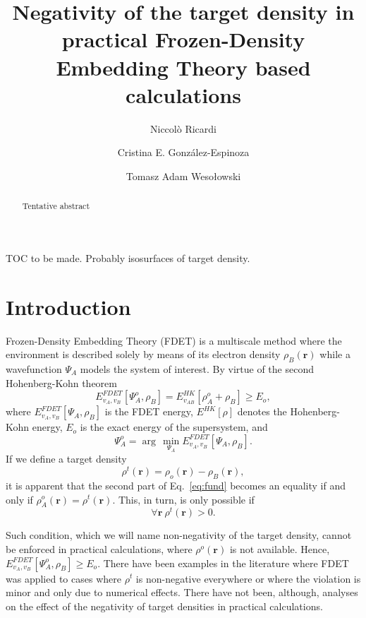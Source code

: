 \documentclass[journal=jctcce,manuscript=article, layout=twocolumn]{achemso}
\author{Niccol\`{o} Ricardi}
\author{Cristina E. Gonz\'{a}lez-Espinoza}
\author{Tomasz Adam Weso\l{}owski}
\affiliation[University of Geneva]
{Department of Physical Chemistry, University of Geneva, Geneva (Switzerland)}
\title[Negativity of the target density]
  {Negativity of the target density in practical Frozen-Density Embedding Theory based calculations}
\begin{document}
\begin{tocentry}

TOC to be made. Probably isosurfaces of target density.

\end{tocentry}


\begin{abstract}
Tentative abstract
\end{abstract}

\section{Introduction}
Frozen-Density Embedding Theory (FDET)\cite{Wesolowski2008, Wesolowski1993} is a multiscale method where the environment is described solely by means of its electron density $\rho_B(\mathbf{r})$ while a wavefunction $\Psi_A$ models the system of interest.
By virtue of the second Hohenberg-Kohn theorem
\begin{equation}\label{eq:fund}
 E_{v_A,v_B}^{FDET}[\Psi^{o}_{A},\rho_B] =  E_{v_{AB}}^{HK}[\rho_A^{o}+\rho_B] \ge E_o,
\end{equation}
where ${E}_{v_A,v_B}^{FDET}[\Psi_{A},\rho_B]$ is the FDET energy, $E^{HK}[\rho]$ denotes the Hohenberg-Kohn energy, $E_o$ is the exact energy of the supersystem, and 
\begin{equation} \label{eq:Psi_o}
 \Psi^{o}_{A} = \arg \, \min \limits_{\Psi_A} E_{v_A,v_B}^{FDET}[\Psi_{A},\rho_B].
\end{equation}
If we define a target density
\begin{equation}\label{eq:target}
 \rho^t(\mathbf{r}) = \rho_o(\mathbf{r}) - \rho_B(\mathbf{r}),
\end{equation}
it is apparent that the second part of Eq.~\ref{eq:fund} becomes an equality if and only if $\rho_A^{o}(\mathbf{r}) = \rho^t(\mathbf{r})$. This, in turn, is only possible if
\begin{equation}\label{eq:non_neg_cond}
\forall \mathbf{r} \ \rho^t(\mathbf{r}) > 0. 
\end{equation}

Such condition, which we will name non-negativity of the target density, cannot be enforced in practical calculations, where $\rho^o(\mathbf{r})$ is not available. Hence, $E_{v_A,v_B}^{FDET}[\Psi^{o}_{A},\rho_B] \geq E_o$. There have been examples in the literature where FDET was applied to cases where $\rho^t$ is non-negative everywhere\cite{Wesolowski2013} or where the violation is minor and only due to numerical effects\cite{Fux2010}. There have not been, although, analyses on the effect of the negativity of target densities in practical calculations.
\end{document}
